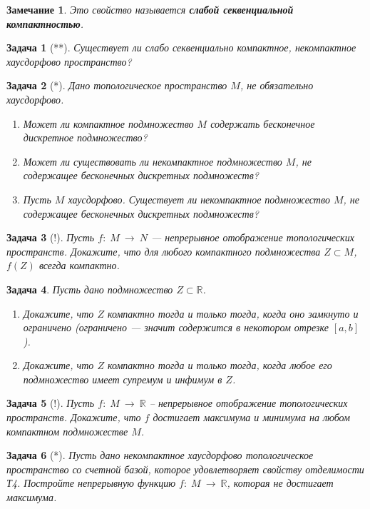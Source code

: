 \documentclass[12pt]{book}
\newcommand{\arrow}{{\:\longrightarrow\:}}
\def\R{{\mathbb R}}
\theoremstyle{upshape}
\newtheorem{zadacha}{Задача}[chapter]
\theoremstyle{generic}
\newtheorem{remark}[teorema]{Замечание}
\def\замечание{\begin{remark}}
\def\еза{\end{remark}}
\theoremstyle{upshapenonumber}
\newcommand{\следствие}{%
     \refstepcounter{teorema}
     {\noindent\bf Следствие \thechapter.\arabic{teorema}:\ }}
\newcommand{\пример}{%
     \refstepcounter{teorema}
     {\noindent\bf Пример \thechapter.\arabic{teorema}:\ }}
\newcommand{\лемма}{%
     \refstepcounter{teorema}
     {\noindent\bf Лемма \thechapter.\arabic{teorema}:\ }}
\newcommand{\теорема}{%
     \refstepcounter{teorema}
     {\noindent\bf Теорема \thechapter.\arabic{teorema}:\ }}
\newcommand{\утверждение}{%
     \refstepcounter{teorema}
     {\noindent\bf Утверждение \thechapter.\arabic{teorema}:\ }}
\def\бф{\bf}
\def\ем{\em}
\def\задача{\begin{zadacha}}
\def\ез{\end{zadacha}}
\def\еу{\end{ukazanie}}
\def\ео{\end{opredelenie}}
\def\енум{\begin{enumerate}}
\def\ее{\end{enumerate}}
\begin{document}
{\замечание
Это свойство называется {\бф слабой секвенциальной
  компактностью}.
\еза

\задача[**] Существует ли слабо секвенциально компактное,
 некомпактное хаусдорфово пространство?
\ез 

\begin{zadacha}[*]
Дано топологическое пространство $M$, не обязательно хаусдорфово.
\begin{enumerate}
\item Может ли компактное подмножество $M$ содержать бесконечное
дискретное подмножество?

\item Может ли существовать ли некомпактное подмножество $M$,
не содержащее бесконечных дискретных подмножеств?

\item[**] Пусть $M$ хаусдорфово.
Существует ли некомпактное подмножество $M$,
не содержащее бесконечных дискретных 
подмножеств?

\end{enumerate}
\end{zadacha}

\begin{zadacha}[!]
Пусть $f:\; M \arrow N$ --- непрерывное отображение
топологических пространств.
Докажите, что для любого компактного подмножества
$Z\subset M$, $f(Z)$ всегда компактно.
\end{zadacha}

\begin{zadacha} 
Пусть дано подмножество $Z\subset\R$.
\begin{enumerate}
\item Докажите, что $Z$ компактно тогда
и только тогда, когда оно замкнуто и ограничено
(ограничено --- значит содержится в некотором 
отрезке $[a, b]$).

\item 
Докажите, что $Z$ компактно тогда и только
тогда, когда любое его подмножество имеет супремум
и инфимум в $Z$. 

\end{enumerate}
\end{zadacha}

\begin{zadacha}[!]
Пусть $f:\; M \arrow \R$ --
непрерывное отображение топологических прос\-т\-р\-анств. 
Докажите, что $f$ достигает максимума и минимума
на любом компактном подмножестве $M$.
\end{zadacha}

\begin{zadacha}[*]
Пусть дано некомпактное 
хаусдорфово топологическое пространство
со счетной базой, которое удовлетворяет 
свойству отделимости Т4.
Постройте непрерывную функцию $f:\; M \arrow \R$,
которая не достигает максимума.
\end{zadacha}

}
\end{document}

